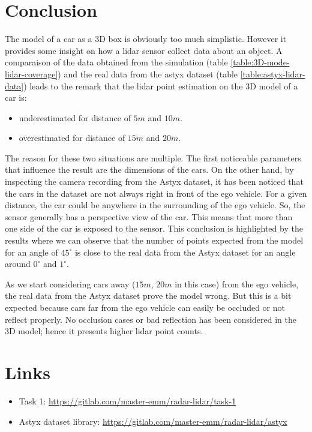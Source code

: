 \documentclass{scrartcl}
\begin{document}
  \section{Conclusion}

  The model of a car as a 3D box is obviously too much simplistic. However
  it provides some insight on how a lidar sensor collect data about an object.
  A comparaison of the data obtained from the simulation (table
  \ref{table:3D-mode-lidar-coverage}) and the real data from the astyx dataset
  (table \ref{table:astyx-lidar-data}) leads to the remark that the lidar point
  estimation on the 3D model of a car is:

  \begin{itemize}
    \item underestimated for distance of $5m$ and $10m$.

    \item overestimated for distance of $15m$ and $20m$.
  \end{itemize}

  The reason for these two situations are multiple. The first noticeable
  parameters that influence the result are the dimensions of the cars.
  On the other hand, by inspecting the camera recording from the Astyx dataset,
  it has been noticed that the cars in the dataset are not always right in
  front of the ego vehicle. For a given distance,
  the car could be anywhere in the surrounding of the ego vehicle.
  So, the sensor generally has a perspective view of the car. This means that
  more than one side of the car is exposed to the sensor.
  This conclusion is highlighted by the results where we can observe that the
  number of points expected from the model for an angle of $45^{\circ}$ is close
  to the real data from the Astyx dataset for an angle around $0^{\circ}$  and
  $1^{\circ}$.

  As we start considering cars away ($15m$, $20m$ in this case) from the ego
  vehicle, the real data from the Astyx dataset prove the model wrong. But this
  is a bit expected because cars far from the ego vehicle can easily be
  occluded or not reflect properly.
  No occlusion cases or bad reflection has been considered in the 3D model;
  hence it presents higher lidar point counts.

  \section{Links}

  \begin{itemize}
    \item Task 1: \url{https://gitlab.com/master-emm/radar-lidar/task-1}

    \item Astyx dataset library:
          \url{https://gitlab.com/master-emm/radar-lidar/astyx}
  \end{itemize}

  \printbibliography
\end{document}
